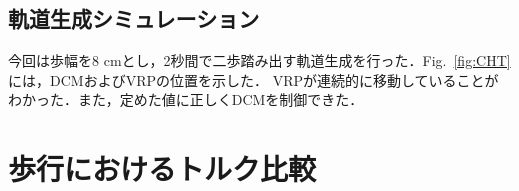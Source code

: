 \documentclass[twocolumn]{jsarticle}
\begin{document}
\subsection{軌道生成シミュレーション}
今回は歩幅を8 cmとし，2秒間で二歩踏み出す軌道生成を行った．Fig.~\ref{fig:CHT}には，DCMおよびVRPの位置を示した．
VRPが連続的に移動していることがわかった．また，定めた値に正しくDCMを制御できた．
    
\section{歩行におけるトルク比較}
\end{document}

